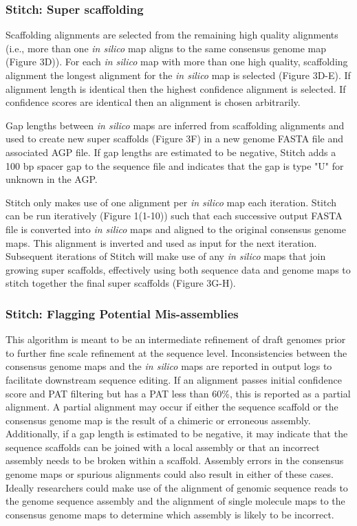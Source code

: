 \documentclass{bmcart}
\begin{document}
\subsubsection*{Stitch: Super scaffolding}

Scaffolding alignments are selected from the remaining high quality alignments (i.e., more than one \textit{in silico} map aligns to the same consensus genome map (Figure 3D)). For each \textit{in silico} map with more than one high quality, scaffolding alignment the longest alignment for the \textit{in silico} map is selected (Figure 3D-E). If alignment length is identical then the highest confidence alignment is selected. If confidence scores are identical then an alignment is chosen arbitrarily.

Gap lengths between \textit{in silico} maps are inferred from scaffolding alignments and used to create new super scaffolds (Figure 3F) in a new genome FASTA file and associated AGP file. If gap lengths are estimated to be negative, Stitch adds a 100 bp spacer gap to the sequence file and indicates that the gap is type "U" for unknown in the AGP. 

Stitch only makes use of one alignment per \textit{in silico} map each iteration. Stitch can be run iteratively (Figure 1(1-10)) such that each successive output FASTA file is converted into \textit{in silico} maps and aligned to the original consensus genome maps. This alignment is inverted and used as input for the next iteration. Subsequent iterations of Stitch will make use of any \textit{in silico} maps that join growing super scaffolds, effectively using both sequence data and genome maps to stitch together the final super scaffolds (Figure 3G-H). 

\subsubsection*{Stitch: Flagging Potential Mis-assemblies}

This algorithm is meant to be an intermediate refinement of draft genomes prior to further fine scale refinement at the sequence level. Inconsistencies between the consensus genome maps and the \textit{in silico} maps are reported in output logs to facilitate downstream sequence editing. If an alignment passes initial confidence score and PAT filtering but has a PAT less than 60\%, this is reported as a partial alignment. A partial alignment may occur if either the sequence scaffold or the consensus genome map is the result of a chimeric or erroneous assembly. Additionally, if a gap length is estimated to be negative, it may indicate that the sequence scaffolds can be joined with a local assembly or that an incorrect assembly needs to be broken within a scaffold. Assembly errors in the consensus genome maps or spurious alignments could also result in either of these cases. Ideally researchers could make use of the alignment of genomic sequence reads to the genome sequence assembly and the alignment of single molecule maps to the consensus genome maps to determine which assembly is likely to be incorrect.
 
\end{document}
